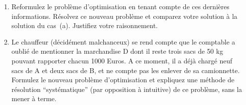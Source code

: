 \begin{enumerate}
\begin{enumerate}
      \item Reformulez le problème d'optimisation en tenant compte de ces
        dernières informations. Résolvez ce nouveau problème et comparez
        votre solution à la solution du cas~(a). Justifiez votre
        raisonnement.

      \item Le chauffeur (décidément malchanceux) se rend compte que le
        comptable a oublié de mentionner la marchandise D dont il reste
        trois sacs de 50 kg pouvant rapporter chacun 1000 Euros. A ce
        moment, il a déjà chargé neuf sacs de A et deux sacs de B, et ne
        compte pas les enlever de sa camionnette. Formulez le nouveau
        problème d'optimisation et expliquez une méthode de résolution
        ``systématique'' (par opposition à intuitive) de ce problème,
        sans la mener à terme.

    \end{enumerate}

    \begin{solution}
      \nosolution
    \end{solution}

\end{enumerate}
